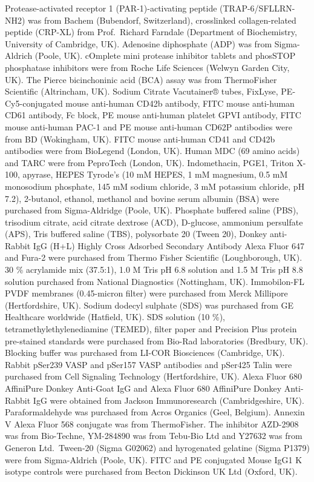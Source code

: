 \documentclass[11pt,twoside]{bristolthesis}
\begin{document}
Protease-activated receptor 1 (PAR-1)-activating peptide (TRAP-6/SFLLRN-NH2) was from Bachem (Bubendorf, Switzerland), crosslinked collagen-related peptide (CRP-XL) from Prof.~Richard Farndale (Department of Biochemistry, University of Cambridge, UK). Adenosine diphosphate (ADP) was from Sigma-Aldrich (Poole, UK). cOmplete mini protease inhibitor tablets and phosSTOP phosphatase inhibitors were from Roche Life Sciences (Welwyn Garden City, UK). The Pierce bicinchoninic acid (BCA) assay was from ThermoFisher Scientific (Altrincham, UK). Sodium Citrate Vacutainer® tubes, FixLyse, PE-Cy5-conjugated mouse anti-human CD42b antibody, FITC mouse anti-human CD61 antibody, Fc block, PE mouse anti-human platelet GPVI antibody, FITC mouse anti-human PAC-1 and PE mouse anti-human CD62P antibodies were from BD (Wokingham, UK). FITC mouse anti-human CD41 and CD42b antibodies were from BioLegend (London, UK). Human MDC (69 amino acids) and TARC were from PeproTech (London, UK). Indomethacin, PGE1, Triton X-100, apyrase, HEPES Tyrode's (10 mM HEPES, 1 mM magnesium, 0.5 mM monosodium phosphate, 145 mM sodium chloride, 3 mM potassium chloride, pH 7.2), 2-butanol, ethanol, methanol and bovine serum albumin (BSA) were purchased from Sigma-Aldridge (Poole, UK). Phosphate buffered saline (PBS), trisodium citrate, acid citrate dextrose (ACD), D-glucose, ammonium persulfate (APS), Tris buffered saline (TBS), polysorbate 20 (Tween 20), Donkey anti-Rabbit IgG (H+L) Highly Cross Adsorbed Secondary Antibody Alexa Fluor 647 and Fura-2 were purchased from Thermo Fisher Scientific (Loughborough, UK). 30 \% acrylamide mix (37.5:1), 1.0 M Tris pH 6.8 solution and 1.5 M Tris pH 8.8 solution purchased from National Diagnostics (Nottingham, UK). Immobilon-FL PVDF membranes (0.45-micron filter) were purchased from Merck Millipore (Hertfordshire, UK). Sodium dodecyl sulphate (SDS) was purchased from GE Healthcare worldwide (Hatfield, UK). SDS solution (10 \%), tetramethylethylenediamine (TEMED), filter paper and Precision Plus protein pre-stained standards were purchased from Bio-Rad laboratories (Bredbury, UK). Blocking buffer was purchased from LI-COR Biosciences (Cambridge, UK). Rabbit pSer239 VASP and pSer157 VASP antibodies and pSer425 Talin were purchased from Cell Signaling Technology (Hertfordshire, UK). Alexa Fluor 680 AffiniPure Donkey Anti-Goat IgG and Alexa Fluor 680 AffiniPure Donkey Anti-Rabbit IgG were obtained from Jackson Immunoresearch (Cambridgeshire, UK). Paraformaldehyde was purchased from Acros Organics (Geel, Belgium). Annexin V Alexa Fluor 568 conjugate was from ThermoFisher. The inhibitor AZD-2908 was from Bio-Techne, YM-284890 was from Tebu-Bio Ltd and Y27632 was from Generon Ltd.~Tween-20 (Sigma G02062) and hyrogenated gelatine (Sigma P1379) were from Sigma-Aldrich (Poole, UK). FITC and PE conjugated Mouse IgG1 K isotype controls were purchased from Becton Dickinson UK Ltd (Oxford, UK).
\end{document}

